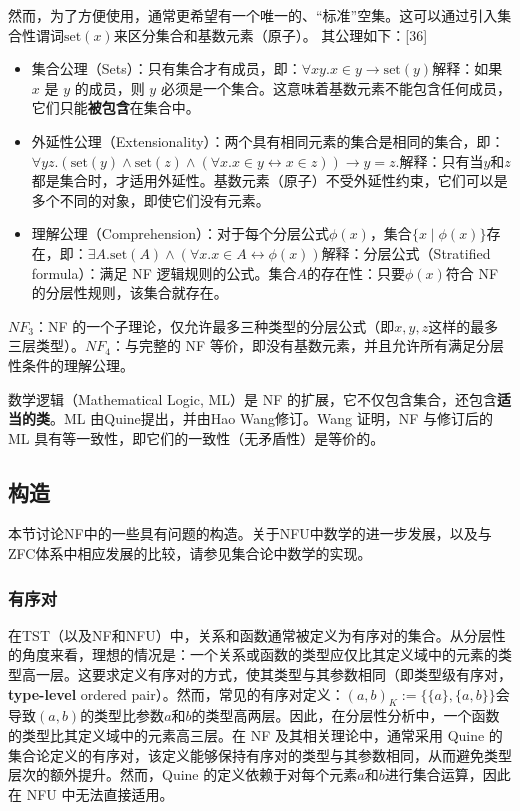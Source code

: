 然而，为了方便使用，通常更希望有一个唯一的、“标准”空集。这可以通过引入集合性谓词\( \text{set}(x)\)来区分集合和基数元素（原子）。  
其公理如下：[36]
\begin{itemize}
\item 集合公理（Sets）：只有集合才有成员，即：\(\forall x y . x \in y \to \text{set}(y)\)解释：如果 \( x \) 是 \( y \) 的成员，则 \( y \) 必须是一个集合。这意味着基数元素不能包含任何成员，它们只能\textbf{被包含}在集合中。
\item 外延性公理（Extensionality）：两个具有相同元素的集合是相同的集合，即：\(\forall y z . (\text{set}(y) \land \text{set}(z) \land (\forall x . x \in y \leftrightarrow x \in z)) \to y = z.\)解释：只有当\( y \)和\( z \)都是集合时，才适用外延性。基数元素（原子）不受外延性约束，它们可以是多个不同的对象，即使它们没有元素。
\item 理解公理（Comprehension）：对于每个分层公式\(\phi(x)\)，集合\(\{x \mid \phi(x)\}\)存在，即：\(\exists A . \text{set}(A) \land (\forall x . x \in A \leftrightarrow \phi(x))\)解释：分层公式（Stratified formula）：满足 NF 逻辑规则的公式。集合\(A\)的存在性：只要\(\phi(x)\)符合 NF 的分层性规则，该集合就存在。
\end{itemize}
\(NF_3\)：NF 的一个子理论，仅允许最多三种类型的分层公式（即\(x, y, z\)这样的最多三层类型）。\(NF_4\)：与完整的 NF 等价，即没有基数元素，并且允许所有满足分层性条件的理解公理。

数学逻辑（Mathematical Logic, ML）是 NF 的扩展，它不仅包含集合，还包含\textbf{适当的类}。ML 由Quine提出，并由Hao Wang修订。Wang 证明，NF 与修订后的 ML 具有等一致性，即它们的一致性（无矛盾性）是等价的。
\subsection{构造} 
本节讨论NF中的一些具有问题的构造。关于NFU中数学的进一步发展，以及与ZFC体系中相应发展的比较，请参见集合论中数学的实现。
\subsubsection{有序对}  
在TST（以及NF和NFU）中，关系和函数通常被定义为有序对的集合。从分层性的角度来看，理想的情况是：一个关系或函数的类型应仅比其定义域中的元素的类型高一层。这要求定义有序对的方式，使其类型与其参数相同（即类型级有序对，\textbf{type-level} ordered pair）。然而，常见的有序对定义：\((a, b)_K := \{\{a\},\{a, b\}\}\)会导致\((a, b)\)的类型比参数\(a\)和\(b\)的类型高两层。因此，在分层性分析中，一个函数的类型比其定义域中的元素高三层。在 NF 及其相关理论中，通常采用 Quine 的集合论定义的有序对，该定义能够保持有序对的类型与其参数相同，从而避免类型层次的额外提升。然而，Quine 的定义依赖于对每个元素\(a\)和\(b\)进行集合运算，因此在 NFU 中无法直接适用。

